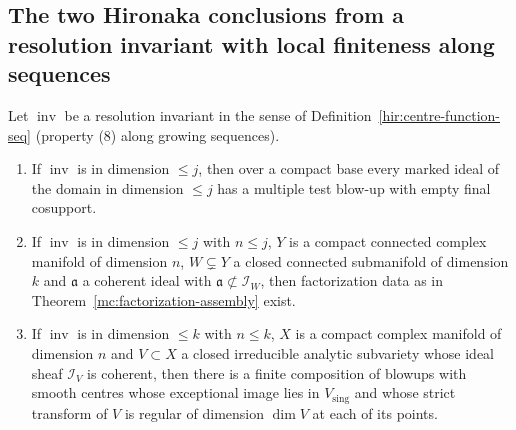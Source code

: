 \subsection{The two Hironaka conclusions from a resolution invariant with local finiteness along sequences}

\begin{theorem}
\label{mc:hironaka-from-seq-invariant}
\leanok
Let \(\operatorname{inv}\) be a resolution invariant in the sense of Definition~\ref{hir:centre-function-seq} (property (8) along growing sequences).
\begin{enumerate}
\item If \(\operatorname{inv}\) is in dimension \(\le j\), then over a compact base every marked ideal of the domain in dimension \(\le j\) has a multiple test blow-up with
empty final cosupport.
\item If \(\operatorname{inv}\) is in dimension \(\le j\) with \(n\le j\), \(Y\) is a compact connected complex manifold of dimension \(n\), \(W\subsetneq Y\) a closed connected
submanifold of dimension \(k\) and \(\mathfrak a\) a coherent ideal with \(\mathfrak a\not\subset\mathcal I_W\), then factorization data as in
Theorem~\ref{mc:factorization-assembly} exist.
\item If \(\operatorname{inv}\) is in dimension \(\le k\) with \(n\le k\), \(X\) is a compact complex manifold of dimension \(n\) and \(V\subset X\) a closed irreducible analytic
subvariety whose ideal sheaf \(\mathcal I_V\) is coherent, then there is a finite composition of blowups with smooth centres whose exceptional image lies in
\(V_{\mathrm{sing}}\) and whose strict transform of \(V\) is regular of dimension \(\dim V\) at each of its points.
\end{enumerate}
\end{theorem}
